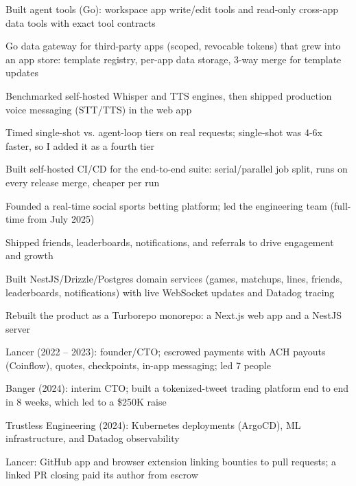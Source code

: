 \documentclass[print]{jack-resume}
\begin{document}
\begin{tightemize}
    \item Built agent tools (Go): workspace app write/edit tools and read-only cross-app data tools with exact tool contracts
    \item Go data gateway for third-party apps (scoped, revocable tokens) that grew into an app store: template registry, per-app data storage, 3-way merge for template updates
    \item Benchmarked self-hosted Whisper and TTS engines, then shipped production voice messaging (STT/TTS) in the web app
    \item Timed single-shot vs. agent-loop tiers on real requests; single-shot was 4-6x faster, so I added it as a fourth tier
    \item Built self-hosted CI/CD for the end-to-end suite: serial/parallel job split, runs on every release merge, cheaper per run
\end{tightemize}
\sectionsep

\begin{tightemize}
    \item Founded a real-time social sports betting platform; led the engineering team (full-time from July 2025)
    \item Shipped friends, leaderboards, notifications, and referrals to drive engagement and growth
    \item Built NestJS/Drizzle/Postgres domain services (games, matchups, lines, friends, leaderboards, notifications) with live WebSocket updates and Datadog tracing
    \item Rebuilt the product as a Turborepo monorepo: a Next.js web app and a NestJS server
\end{tightemize}
\sectionsep

\begin{tightemize}
    \item Lancer (2022 -- 2023): founder/CTO; escrowed payments with ACH payouts (Coinflow), quotes, checkpoints, in-app messaging; led 7 people
    \item Banger (2024): interim CTO; built a tokenized-tweet trading platform end to end in 8 weeks, which led to a \$250K raise
    \item Trustless Engineering (2024): Kubernetes deployments (ArgoCD), ML infrastructure, and Datadog observability
    \item Lancer: GitHub app and browser extension linking bounties to pull requests; a linked PR closing paid its author from escrow
\end{tightemize}
\sectionsep
\end{document}
